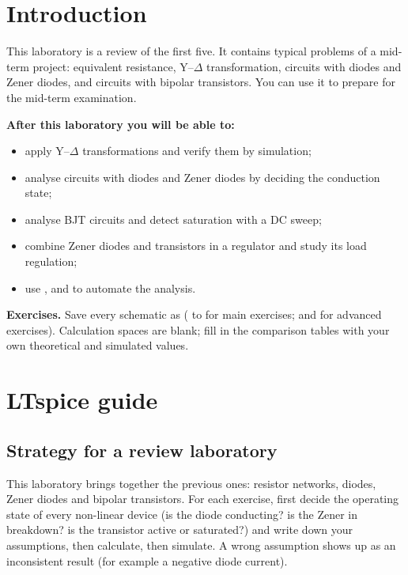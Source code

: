 
\section{Introduction}
This laboratory is a review of the first five. It contains typical problems of a mid-term project: equivalent resistance, Y--$\Delta$ transformation, circuits with diodes and Zener diodes, and circuits with bipolar transistors. You can use it to prepare for the mid-term examination.

\textbf{After this laboratory you will be able to:}
\begin{itemize}
  \item apply Y--$\Delta$ transformations and verify them by simulation;
  \item analyse circuits with diodes and Zener diodes by deciding the conduction state;
  \item analyse BJT circuits and detect saturation with a DC sweep;
  \item combine Zener diodes and transistors in a regulator and study its load regulation;
  \item use ,  and  to automate the analysis.
\end{itemize}

\textbf{Exercises.} Save every schematic as  ( to  for main exercises;  and  for advanced exercises). Calculation spaces are blank; fill in the comparison tables with your own theoretical and simulated values.

\section{LTspice guide}

\subsection{Strategy for a review laboratory}
This laboratory brings together the previous ones: resistor networks, diodes, Zener diodes and bipolar transistors. For each exercise, first decide the operating state of every non-linear device (is the diode conducting? is the Zener in breakdown? is the transistor active or saturated?) and write down your assumptions, then calculate, then simulate. A wrong assumption shows up as an inconsistent result (for example a negative diode current).

